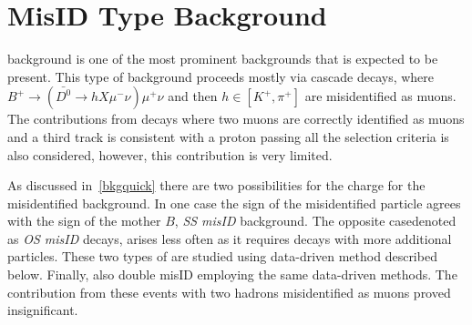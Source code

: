 \section{MisID Type Background}
\label{misidprocedure}
\DIFdelbegin {}\DIFdelend \DIFaddbegin {}\DIFaddend background is one of the most prominent backgrounds that is expected to be present. This type of background proceeds mostly via cascade decays, where $B^{+} \rightarrow (\bar{D^{0}} \rightarrow h X \mu^{-} \nu) \mu^{+} \nu$ and then $h\in[K^{+},\pi^{+}]$ are misidentified as muons. The contributions from decays where two muons are correctly identified as muons and a third track is consistent with a proton passing all the selection criteria is also considered, however, this contribution is very limited. 

As discussed in~\autoref{bkgquick} there are two possibilities for the charge for the misidentified background. In one case the sign of the misidentified particle agrees with the sign of the mother $B$, \textit{SS misID} background. The opposite case\DIFdelbegin {}\DIFdelend \DIFaddbegin \DIFadd{, }\DIFaddend denoted as \textit{OS misID} decays, \DIFdelbegin {}\DIFdelend arises less often as it requires decays with more additional particles. These two types of \DIFdelbegin {}\DIFdelend \DIFaddbegin {}\DIFaddend are studied using \DIFaddbegin {}\DIFaddend data-driven method described below. Finally, also double misID \DIFaddbegin {}\DIFaddend employing the same data-driven methods\DIFdelbegin {}\DIFdelend . The contribution from these events with two hadrons misidentified as muons proved insignificant.


